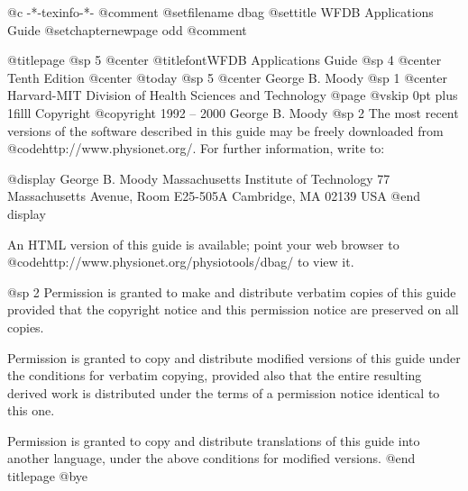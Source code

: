   @c -*-texinfo-*-
@comment %
@setfilename dbag
@settitle WFDB Applications Guide
@setchapternewpage odd
@comment %

@titlepage
@sp 5
@center @titlefont{WFDB Applications Guide}
@sp 4
@center Tenth Edition
@center @today
@sp 5
@center George B. Moody
@sp 1
@center Harvard-MIT Division of Health Sciences and Technology
@page
@vskip 0pt plus 1filll
Copyright @copyright{} 1992 -- 2000 George B. Moody
@sp 2
The most recent versions of the software described in this guide may be
freely downloaded from @code{http://www.physionet.org/}. For further
information, write to:

@display
George B. Moody
Massachusetts Institute of Technology
77 Massachusetts Avenue, Room E25-505A
Cambridge, MA 02139
USA
@end display

An HTML version of this guide is available;  point your web browser to
@code{http://www.physionet.org/physiotools/dbag/} to view it.



@sp 2
Permission is granted to make and distribute verbatim copies of this
guide provided that the copyright notice and this permission notice are
preserved on all copies.

Permission is granted to copy and distribute modified versions of this
guide under the conditions for verbatim copying, provided also that the
entire resulting derived work is distributed under the terms of a
permission notice identical to this one.

Permission is granted to copy and distribute translations of this guide
into another language, under the above conditions for modified versions.
@end titlepage
@bye
